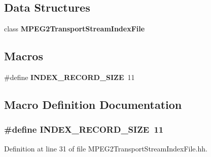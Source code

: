 \subsection*{Data Structures}
\begin{DoxyCompactItemize}
\item 
class {\bf M\+P\+E\+G2\+Transport\+Stream\+Index\+File}
\end{DoxyCompactItemize}
\subsection*{Macros}
\begin{DoxyCompactItemize}
\item 
\#define {\bf I\+N\+D\+E\+X\+\_\+\+R\+E\+C\+O\+R\+D\+\_\+\+S\+I\+Z\+E}~11
\end{DoxyCompactItemize}


\subsection{Macro Definition Documentation}
\subsubsection[{I\+N\+D\+E\+X\+\_\+\+R\+E\+C\+O\+R\+D\+\_\+\+S\+I\+Z\+E}]{\setlength{\rightskip}{0pt plus 5cm}\#define I\+N\+D\+E\+X\+\_\+\+R\+E\+C\+O\+R\+D\+\_\+\+S\+I\+Z\+E~11}\label{MPEG2TransportStreamIndexFile_8hh_aea5f172e62c12879ad4182105d4e268d}


Definition at line 31 of file M\+P\+E\+G2\+Transport\+Stream\+Index\+File.\+hh.

